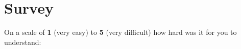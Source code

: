 \documentclass[english,a4paper,twoside,print_questionnaire_id,checkmode=fill]{sdaps}
\begin{document}
\begin{questionnaire}[noinfo]
\begin{minipage}{0.3\textwidth}
\begin{choicegroup}{}
            \end{choicegroup}

        \end{minipage}%
        \hspace{0.2\textwidth}%
        \begin{minipage}{0.3\textwidth}

            \begin{choicegroup}{}



            \end{choicegroup}

        \end{minipage}

    \section{Survey}

		On a scale of \textbf{1} (very easy) to \textbf{5} (very difficult) how hard was it for you to understand:

		\begin{choicegroup}{}


		
		\end{choicegroup}
    \end{questionnaire}
\end{document}
